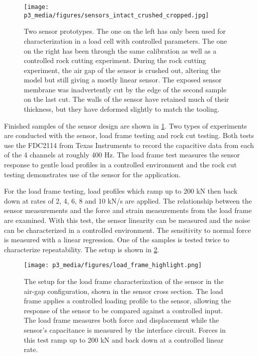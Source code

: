 \begin{figure}
\centering
\texttt{[image: p3\_media/figures/sensors\_intact\_crushed\_cropped.jpg]}
\caption{Two sensor prototypes. The one on the left has only been used for characterization 
in a load cell with controlled parameters. The one on the right has been through the same 
calibration as well as a controlled rock cutting experiment. During the rock cutting experiment,
the air gap of the sensor is crushed out, altering the model but still giving a mostly linear sensor.
The exposed sensor membrane was inadvertently cut by the edge of the second sample on the last cut.
The walls of the sensor have retained much of their thickness, but they have deformed slightly to 
match the tooling.}
\label{fig:sensors_prototypes}
\end{figure}

Finished samples of the sensor design are shown
in \ref{fig:sensors_prototypes}.
Two types of experiments are conducted with the sensor, 
load frame testing and rock cut testing.
Both tests use the FDC2114 from Texas Instruments to record the 
capacitive data from each of the 4 channels at roughly 400 Hz. 
The load frame test measures the sensor response to gentle load profiles in a controlled environment
and the rock cut testing demonstrates use of the sensor for the application.

For the load frame testing, load profiles which ramp up to 200 kN 
then back down at rates of 2, 4, 6, 8 and 10 kN/s are applied. 
The relationship between the sensor measurements 
and the force and strain measurements from the load frame are examined.
With this test, the sensor linearity can be measured and the noise
can be characterized in a controlled environment. 
The sensitivity to normal force is measured with a linear regression.
One of the samples is tested twice to characterize repeatability.
The setup is shown in \ref{fig:loadframe}.

\begin{figure}
\centering
\texttt{[image: p3\_media/figures/load\_frame\_highlight.png]}
\caption{The setup for the load frame characterization of the sensor in the air-gap configuration, 
shown in the sensor cross section.
The load frame applies a controlled loading profile to the sensor, allowing the response of the sensor
to be compared against a controlled input. The load frame measures both force and displacement while
the sensor's capacitance is measured by the interface circuit.
Forces in this test ramp up to 200 kN and back down at a controlled linear rate.}
\label{fig:loadframe}
\end{figure}


